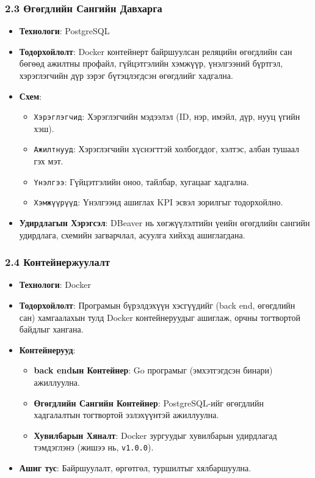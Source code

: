 \subsubsection*{2.3 Өгөгдлийн Сангийн Давхарга}
\begin{itemize}
    \item \textbf{Технологи}: PostgreSQL
    \item \textbf{Тодорхойлолт}: Docker контейнерт байршуулсан реляцийн өгөгдлийн сан бөгөөд ажилтны профайл, гүйцэтгэлийн хэмжүүр, үнэлгээний бүртгэл, хэрэглэгчийн дүр зэрэг бүтэцлэгдсэн өгөгдлийг хадгална.
    \item \textbf{Схем}:
    \begin{itemize}
        \item \texttt{Хэрэглэгчид}: Хэрэглэгчийн мэдээлэл (ID, нэр, имэйл, дүр, нууц үгийн хэш).
        \item \texttt{Ажилтнууд}: Хэрэглэгчийн хүснэгттэй холбогддог, хэлтэс, албан тушаал гэх мэт.
        \item \texttt{Үнэлгээ}: Гүйцэтгэлийн оноо, тайлбар, хугацааг хадгална.
        \item \texttt{Хэмжүүрүүд}: Үнэлгээнд ашиглах KPI эсвэл зорилгыг тодорхойлно.
    \end{itemize}
    \item \textbf{Удирдлагын Хэрэгсэл}: DBeaver нь хөгжүүлэлтийн үеийн өгөгдлийн сангийн удирдлага, схемийн загварчлал, асуулга хийхэд ашиглагдана.
\end{itemize}

\subsubsection*{2.4 Контейнержуулалт}
\begin{itemize}
    \item \textbf{Технологи}: Docker
    \item \textbf{Тодорхойлолт}: Програмын бүрэлдэхүүн хэсгүүдийг (back end, өгөгдлийн сан) хамгаалахын тулд Docker контейнеруудыг ашиглаж, орчны тогтвортой байдлыг хангана.
    \item \textbf{Контейнерууд}:
    \begin{itemize}
        \item \textbf{back endын Контейнер}: Go програмыг (эмхэтгэгдсэн бинари) ажиллуулна.
        \item \textbf{Өгөгдлийн Сангийн Контейнер}: PostgreSQL-ийг өгөгдлийн хадгалалтын тогтвортой эзлэхүүнтэй ажиллуулна.
        \item \textbf{Хувилбарын Хяналт}: Docker зургуудыг хувилбарын удирдлагад тэмдэглэнэ (жишээ нь, \texttt{v1.0.0}).
    \end{itemize}
    \item \textbf{Ашиг тус}: Байршуулалт, өргөтгөл, туршилтыг хялбаршуулна.
\end{itemize}

